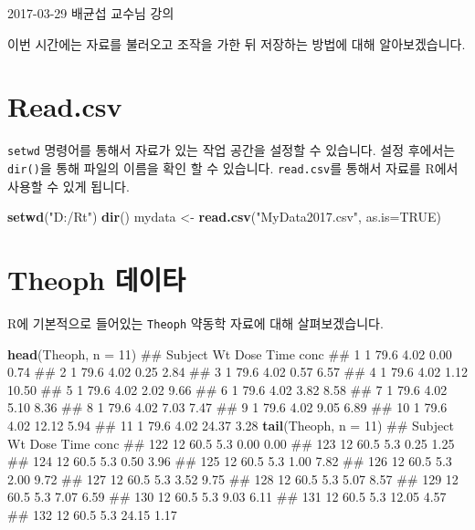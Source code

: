 \documentclass[10pt,]{krantz}
\makeatletter
\newenvironment{Shaded}{\begin{snugshade}}{\end{snugshade}}
\newcommand{\KeywordTok}[1]{\textcolor[rgb]{0.13,0.29,0.53}{\textbf{#1}}}
\newcommand{\DataTypeTok}[1]{\textcolor[rgb]{0.13,0.29,0.53}{#1}}
\newcommand{\DecValTok}[1]{\textcolor[rgb]{0.00,0.00,0.81}{#1}}
\newcommand{\StringTok}[1]{\textcolor[rgb]{0.31,0.60,0.02}{#1}}
\newcommand{\OtherTok}[1]{\textcolor[rgb]{0.56,0.35,0.01}{#1}}
\newcommand{\NormalTok}[1]{#1}
\renewenvironment{quote}{\begin{VF}}{\end{VF}}
\newenvironment{kframe}{%
\medskip{}
\setlength{\fboxsep}{.8em}
 \def\at@end@of@kframe{}%
 \ifinner\ifhmode%
  \def\at@end@of@kframe{\end{minipage}}%
  \begin{minipage}{\columnwidth}%
 \fi\fi%
 \def\FrameCommand##1{\hskip\@totalleftmargin \hskip-\fboxsep
 \colorbox{shadecolor}{##1}\hskip-\fboxsep
     \hskip-\linewidth \hskip-\@totalleftmargin \hskip\columnwidth}%
 \MakeFramed {\advance\hsize-\width
   \@totalleftmargin\z@ \linewidth\hsize
   \@setminipage}}%
 {\par\unskip\endMakeFramed%
 \at@end@of@kframe}
\renewenvironment{Shaded}{\begin{kframe}}{\end{kframe}}
\theoremstyle{definition}
\theoremstyle{definition}
\theoremstyle{remark}
\makeatother
\begin{document}
\begin{quote}
2017-03-29 배균섭 교수님 강의
\end{quote}

이번 시간에는 자료를 불러오고 조작을 가한 뒤 저장하는 방법에 대해
알아보겠습니다.

\section{Read.csv}\label{read.csv}

\texttt{setwd} 명령어를 통해서 자료가 있는 작업 공간을 설정할 수
있습니다. 설정 후에서는 \texttt{dir()}을 통해 파일의 이름을 확인 할 수
있습니다. \texttt{read.csv}를 통해서 자료를 R에서 사용할 수 있게 됩니다.

\begin{Shaded}
\begin{Highlighting}[]
\KeywordTok{setwd}\NormalTok{(}\StringTok{"D:/Rt"}\NormalTok{)}
\KeywordTok{dir}\NormalTok{()}
\NormalTok{mydata <-}\StringTok{ }\KeywordTok{read.csv}\NormalTok{(}\StringTok{"MyData2017.csv"}\NormalTok{, }\DataTypeTok{as.is=}\OtherTok{TRUE}\NormalTok{)}
\end{Highlighting}
\end{Shaded}

\section{Theoph 데이타}\label{theoph-}

R에 기본적으로 들어있는 \texttt{Theoph} 약동학 자료에 대해
살펴보겠습니다.

\begin{Shaded}
\begin{Highlighting}[]
\KeywordTok{head}\NormalTok{(Theoph, }\DataTypeTok{n =} \DecValTok{11}\NormalTok{)}
\NormalTok{##    Subject   Wt Dose  Time  conc}
\NormalTok{## 1        1 79.6 4.02  0.00  0.74}
\NormalTok{## 2        1 79.6 4.02  0.25  2.84}
\NormalTok{## 3        1 79.6 4.02  0.57  6.57}
\NormalTok{## 4        1 79.6 4.02  1.12 10.50}
\NormalTok{## 5        1 79.6 4.02  2.02  9.66}
\NormalTok{## 6        1 79.6 4.02  3.82  8.58}
\NormalTok{## 7        1 79.6 4.02  5.10  8.36}
\NormalTok{## 8        1 79.6 4.02  7.03  7.47}
\NormalTok{## 9        1 79.6 4.02  9.05  6.89}
\NormalTok{## 10       1 79.6 4.02 12.12  5.94}
\NormalTok{## 11       1 79.6 4.02 24.37  3.28}
\KeywordTok{tail}\NormalTok{(Theoph, }\DataTypeTok{n =} \DecValTok{11}\NormalTok{)}
\NormalTok{##     Subject   Wt Dose  Time conc}
\NormalTok{## 122      12 60.5  5.3  0.00 0.00}
\NormalTok{## 123      12 60.5  5.3  0.25 1.25}
\NormalTok{## 124      12 60.5  5.3  0.50 3.96}
\NormalTok{## 125      12 60.5  5.3  1.00 7.82}
\NormalTok{## 126      12 60.5  5.3  2.00 9.72}
\NormalTok{## 127      12 60.5  5.3  3.52 9.75}
\NormalTok{## 128      12 60.5  5.3  5.07 8.57}
\NormalTok{## 129      12 60.5  5.3  7.07 6.59}
\NormalTok{## 130      12 60.5  5.3  9.03 6.11}
\NormalTok{## 131      12 60.5  5.3 12.05 4.57}
\NormalTok{## 132      12 60.5  5.3 24.15 1.17}
\end{Highlighting}
\end{Shaded}
\end{document}
